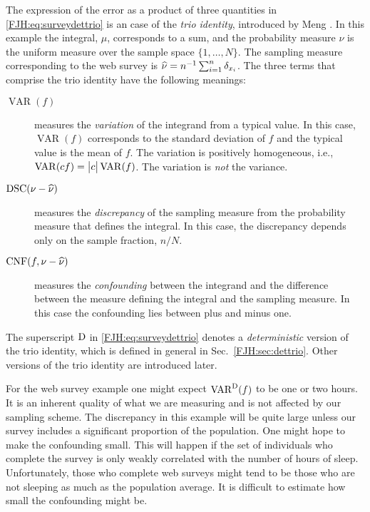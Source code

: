 \documentclass[graybox,footinfo]{svmult}
\DeclareMathOperator{\algn}{CNF}
\DeclareMathOperator{\disc}{DSC}
\DeclareMathOperator{\Var}{VAR}
\begin{document}
The expression of the error as a product of three quantities in 
\eqref{FJH:eq:surveydettrio} is an case of the \emph{trio identity}, introduced by Meng 
\cite{Men16a}.  In this example the integral, $\mu$, corresponds to a sum, 
and the probability measure $\nu$ is the uniform measure over the sample space $\{1, 
\ldots, N\}$.  The sampling measure corresponding to the web survey is $\widehat{\nu} = 
n^{-1} \sum_{i=1}^n \delta_{x_i}$.  The three terms that comprise the trio identity have the 
following meanings:
\begin{description}
	\item[$\Var(f)$] measures the \emph{variation} of the integrand from a typical value. 
	In 	this case, $\Var(f)$ corresponds to the standard deviation of $f$ and the typical 
	value	is the mean of $f$. The variation is positively homogeneous, i.e., $\Var(cf)  = 
	\abs{c} \Var(f)$.  The variation is \emph{not} the variance.
	\item [$\disc(\nu - \hnu)$] measures the \emph{discrepancy} of the sampling 
	measure 
	from the probability measure that defines the integral.  In this case, the discrepancy 
	depends only on the sample fraction, $n/N$.
	\item [$\algn(f,\nu - \hnu)$] measures the \emph{confounding} between the 
	integrand and the difference between the measure defining the integral and the 
	sampling measure.  In this case the confounding lies between plus and minus one.
\end{description}
The superscript $\textup{D}$ in \eqref{FJH:eq:surveydettrio} denotes a \emph{deterministic} 
version of the trio identity, which is defined in general in Sec.\ \ref{FJH:sec:dettrio}. 
Other versions of the trio identity are introduced later.

\begin{FJHLesson}
	\FJHLessonZero
\end{FJHLesson}

For the web survey example one might expect $\Var^\Dt(f)$ to be one or two hours.  It 
is an inherent quality of what we are measuring and is not affected by our sampling 
scheme.  The discrepancy in this example will be quite large unless our survey includes a 
significant proportion of the population.  One might hope to make  the confounding 
small.  This will happen if the set of individuals who complete the survey 
is only weakly correlated with the number of hours of sleep.  Unfortunately, those who  
complete web surveys might tend to be those who are not sleeping as much as the 
population average.  It is difficult to estimate how small the confounding might be.  
\end{document}
